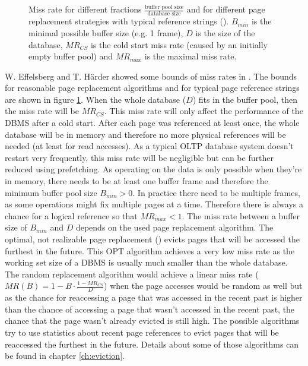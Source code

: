 \begin{@empty}
\begin{figure}[ht!]
{
		}
		\caption{Miss rate for different fractions $\frac{\text{buffer pool size}}{\text{database size}}$ and for different page replacement strategies with typical reference strings (\cite{Effelsberg:1984}). $B_{min}$ is the minimal possible buffer size (e.g. 1 frame), $D$ is the size of the database, $MR_{CS}$ is the cold start miss rate (caused by an initially empty buffer pool) and $MR_{max}$ is the maximal miss rate.}
		\label{fig:missratetheoretical}
	\end{figure}
\end{@empty}

	W. Effelsberg and T. Härder showed some bounds of miss rates in \cite{Effelsberg:1984}. The bounds for reasonable page replacement algorithms and for typical page reference strings are shown in figure \ref{fig:missratetheoretical}. When the whole database ($D$) fits in the buffer pool, then the miss rate will be $MR_{CS}$. This miss rate will only affect the performance of the DBMS after a cold start. After each page was referenced at least once, the whole database will be in memory and therefore no more physical references will be needed (at least for read accesses). As a typical OLTP database system doesn't restart very frequently, this miss rate will be negligible but can be further reduced using prefetching. As operating on the data is only possible when they're in memory, there needs to be at least one buffer frame and therefore the minimum buffer pool  size $B_{min} > 0$. In practice there need to be multiple frames, as some operations might fix multiple pages at a time. Therefore there is always a chance for a logical reference so that $MR_{max} < 1$. The miss rate between a buffer size of $B_{min}$ and $D$ depends on the used page replacement algorithm. The optimal, not realizable page replacement (\cite{Belady:1966}) evicts pages that will be accessed the furthest in the future. This OPT algorithm achieves a very low miss rate as the working set size of a DBMS is usually much smaller than the whole database. The random replacement algorithm would achieve a linear miss rate ($MR\left(B\right) = 1 - B \cdot \frac{1 - MR_{CS}}{D}$) when the page accesses would be random as well but as the chance for reaccessing a page that was accessed in the recent past is higher than the chance of accessing a page that wasn't accessed in the recent past, the chance that the page wasn't already evicted is still high. The possible algorithms try to use statistics about recent page references to evict pages that will be reaccessed the furthest in the future. Details about some of those algorithms can be found in chapter \ref{ch:eviction}.
	
